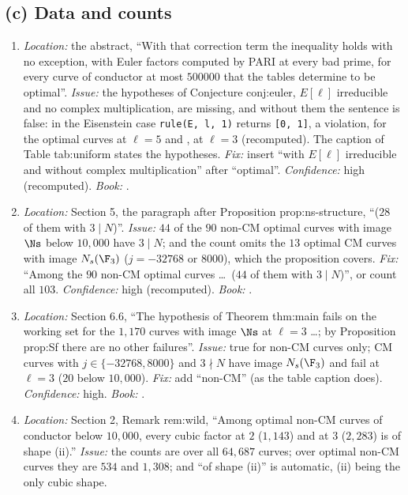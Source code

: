 \begin{sloppypar}
\subsection*{(c) Data and counts}
\begin{enumerate}[resume*=errata]
\item\label{err:paper:abstract-scope} \emph{Location:} the abstract, ``With that correction term the inequality holds with no exception, with Euler factors computed by PARI
at every bad prime, for every curve of conductor at most $500000$ that the tables determine to be optimal''. \emph{Issue:} the hypotheses of Conjecture conj:euler, $E[\ell]$ irreducible
and no complex multiplication, are missing, and without them the sentence is false: in the Eisenstein case \texttt{rule(E, l, 1)} returns \texttt{[0, 1]}, a violation, for the optimal
curves  at $\ell=5$ and ,  at $\ell=3$ (recomputed). The caption of Table tab:uniform states the hypotheses. \emph{Fix:} insert ``with $E[\ell]$
irreducible and without complex multiplication'' after ``optimal''. \emph{Confidence:} high (recomputed). \emph{Book:} .
\item\label{err:paper:28} \emph{Location:} Section 5, the paragraph after Proposition prop:ns-structure, ``($28$ of them with $3\mid N$)''. \emph{Issue:} $44$ of the $90$ non-CM optimal curves with image $\Ns$ below
$10{,}000$ have $3\mid N$; and the count omits the $13$ optimal CM curves with image $N_s(\F_3)$ ($j=-32768$ or $8000$), which the proposition covers. \emph{Fix:} ``Among the $90$ non-CM optimal
curves \dots\ ($44$ of them with $3\mid N$)'', or count all $103$. \emph{Confidence:} high (recomputed). \emph{Book:} .
\item\label{err:paper:1170} \emph{Location:} Section 6.6, ``The hypothesis of Theorem thm:main fails on the working set for the $1{,}170$ curves with image $\Ns$ at $\ell=3$ \dots; by
Proposition prop:Sf there are no other failures''. \emph{Issue:} true for non-CM curves only; CM curves with $j\in\{-32768,8000\}$ and $3\nmid N$ have image $N_s(\F_3)$ and fail at $\ell=3$ ($20$ below
$10{,}000$). \emph{Fix:} add ``non-CM'' (as the table caption does). \emph{Confidence:} high. \emph{Book:} .
\item\label{err:paper:cubic-counts} \emph{Location:} Section 2, Remark rem:wild, ``Among optimal non-CM curves of conductor below $10{,}000$, every cubic factor at $2$ ($1{,}143$) and at $3$ ($2{,}283$) is of shape
(ii).'' \emph{Issue:} the counts are over all $64{,}687$ curves; over optimal non-CM curves they are $534$ and $1{,}308$; and ``of shape (ii)'' is automatic, (ii) being the only cubic shape.

\end{enumerate}
\end{sloppypar}
